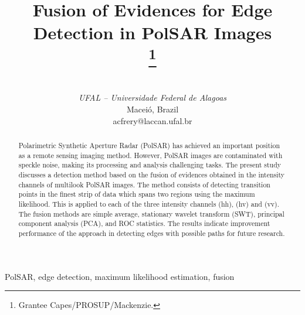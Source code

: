 \documentclass[conference]{IEEEtran}
\begin{document}
\title{Fusion of Evidences for Edge Detection in PolSAR Images\\
\thanks{Grantee Capes/PROSUP/Mackenzie.}
}
\author{
\and
{}
\and
{}
 \\
\textit{UFAL -- Universidade Federal de Alagoas}\\
Maceió, Brazil \\
acfrery@laccan.ufal.br}
\maketitle
\begin{abstract}
Polarimetric Synthetic Aperture Radar (PolSAR) has achieved an important position as a remote sensing imaging method. 
However, PolSAR images are contaminated with speckle noise, making its processing and analysis challenging tasks. 
The present study discusses a detection method based on the fusion of evidences obtained in the intensity channels of multilook PolSAR images.
The method consists of detecting transition points in the finest strip of data which spans two regions using the maximum likelihood.
This is applied to each of the three intensity channels (hh), (hv) and (vv). 
The fusion methods are simple average, stationary wavelet transform (SWT), principal component analysis (PCA), and ROC statistics.  
The results indicate improvement performance of the approach in detecting edges with possible paths for future research.
\end{abstract}

\begin{IEEEkeywords}
PolSAR, edge detection, maximum likelihood estimation, fusion
\end{IEEEkeywords}
\end{document}
